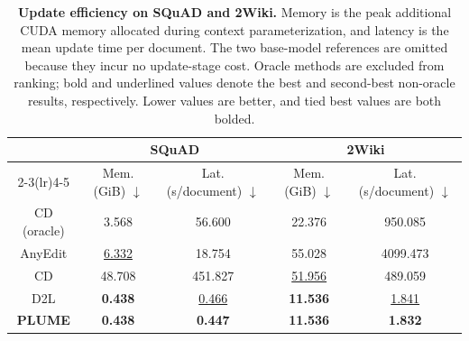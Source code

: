 \begin{table}[!t]
\centering
\small
\setlength{\tabcolsep}{5pt}
\renewcommand{\arraystretch}{1.15}
\providecommand{\MethodHeaderVShift}{-0.3ex}
\begin{tabular}{ccccc}
\toprule
\multirow{2}{*}{\raisebox{\MethodHeaderVShift}{\textbf{Method}}}
& \multicolumn{2}{c}{SQuAD}
& \multicolumn{2}{c}{2Wiki} \\
\cmidrule(lr){2-3}\cmidrule(lr){4-5}
& Mem. (GiB) $\downarrow$
& Lat. (s/document) $\downarrow$
& Mem. (GiB) $\downarrow$
& Lat. (s/document) $\downarrow$ \\
\midrule
CD (oracle)      & 3.568 & 56.600 & 22.376 & 950.085 \\
\midrule
AnyEdit          & \underline{6.332} & 18.754 & 55.028 & 4099.473 \\
CD               & 48.708 & 451.827 & \underline{51.956} & 489.059 \\
D2L              & \textbf{0.438} & \underline{0.466} & \textbf{11.536} & \underline{1.841} \\
\midrule
\textbf{PLUME}   & \textbf{0.438} & \textbf{0.447} & \textbf{11.536} & \textbf{1.832} \\
\bottomrule
\end{tabular}
\caption{
\textbf{Update efficiency on SQuAD and 2Wiki.}
Memory is the peak additional CUDA memory allocated during context
parameterization, and latency is the mean update time per document. The two
base-model references are omitted because they incur no update-stage cost.
Oracle methods are excluded from ranking; bold and underlined values denote
the best and second-best non-oracle results, respectively. Lower values are
better, and tied best values are both bolded.
}
\label{tab:update-efficiency}
\end{table}
